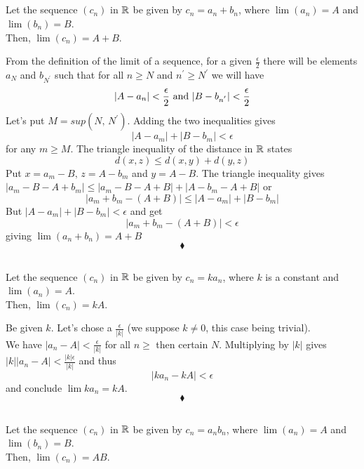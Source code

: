 \subsection{}
\begin{tcolorbox}
Let the sequence $(c_n)$ in $\mathbb{R}$ be given by $c_n = a_n+b_n$, where $\lim(a_n)= A$ and $\lim(b_n)= B$.\\
 Then, $\lim (c_n)= A +B$.
\end{tcolorbox}
From the definition of the limit of a sequence, for a given $\frac{\epsilon}{2}$ there will be elements $a_N$ and $b_{N^{'}}$ such that for all $n\geq N$ and $n^{'}\geq {N^{'}}$ we will have 
$$|A-a_n|<\frac{\epsilon}{2}\text{ and } |B-b_{n^{'}}|<\frac{\epsilon}{2}$$
Let's put $M=sup(N,\,N^{'})$. 
Adding the two inequalities gives 
$$|A-a_m|+|B-b_{m^{}}|<\epsilon$$
for any $m\geq M$.
The triangle inequality of the distance in $\mathbb{R}$ states
$$d(x,z)\leq d(x,y)+d(y,z)$$
Put $x= a_m-B,\, z= A-b_m$ and $y= A-B$. The triangle inequality gives $|a_m-B-A+b_m  | \leq |a_m-B-A+B |+|A-b_m -A+B |$ or
$$|a_m+b_m-(A+B)| \leq |A-a_m |+|B-b_m |$$
But $|A-a_m|+|B-b_{m^{}}|<\epsilon$ and get 
$$|a_m+b_m-(A+B)| <\epsilon$$
giving $\lim (a_n+b_n)= A+B$
$$\blacklozenge$$

\subsection{}
\begin{tcolorbox}
 Let the sequence $(c_n)$ in $\mathbb{R}$ be given by $c_n = ka_n$, where $k$ is a constant and $\lim (a_n)= A$.\\
 Then, $\lim (c_n)= kA$.
\end{tcolorbox}
Be given $k$. Let's chose a $\frac{\epsilon}{|k|}$ (we suppose $k\neq 0$, this case being trivial).\\
We have $|a_n-A|<\frac{\epsilon}{|k|}$ for all $n\geq$ then  certain $N$. Multiplying by $|k|$ gives $|k||a_n-A|<\frac{|k|\epsilon}{|k|}$ and thus
$$|ka_n-kA|<\epsilon$$
and conclude $\lim ka_n= kA$.
$$\blacklozenge$$
\newpage
\subsection{}
\begin{tcolorbox}
 Let the sequence $(c_n)$ in $\mathbb{R}$ be given by $c_n = a_nb_n$, where $\lim (a_n)= A$ and $\lim (b_n)= B$.\\
 Then, $\lim (c_n)= AB$. 
\end{tcolorbox}


